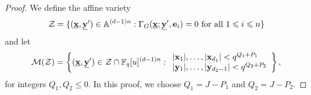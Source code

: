 \documentclass[12pt, reqno]{amsart}
\numberwithin{equation}{section}
\newcommand{\0}{\mathbf{0}}
\renewcommand{\leq}{\leqslant}
\newcommand{\x}{\mathbf{x}}
\newcommand{\y}{\mathbf{y}}
\renewcommand{\=}{\equiv}
\newcommand{\1}{\mathbf{1}}
\theoremstyle{definition}
\begin{document}
\begin{proof}
We define the affine variety
$$
\mathcal{Z} = \{   (\underline{\mathbf{x}}, \underline{\mathbf{y}}' ) \in \mathbb{A}^{(d - 1) n }  :
\Gamma_G(  \underline{\mathbf{x}};  \underline{\mathbf{y}}', \mathbf{e}_{i} ) = 0   \textnormal{ for all $1 \leq i \leq n$}  \}
$$
and let
$$
\mathcal{M}(\mathcal{Z})
=
\notag
\left\{
(\underline{\mathbf{x}}, \underline{\mathbf{y}}') \in \mathcal{Z} \cap \mathbb{F}_q[u]^{(d - 1) n}  :
\begin{array}{l}
|\x_{1}|, \ldots, |\x_{d_1}| < q^{ Q_1 + P_1 }  \\
|\y_{1}|, \ldots, |\y_{d_2-1}|  < q^{ Q_2 + P_2 }
\end{array}{}
\right\},
$$
for integers $Q_1,Q_2\leq 0$.
In this proof, we choose $Q_1 = J - P_1$ and $Q_2 = J - P_2$.


\end{proof}
\end{document}
